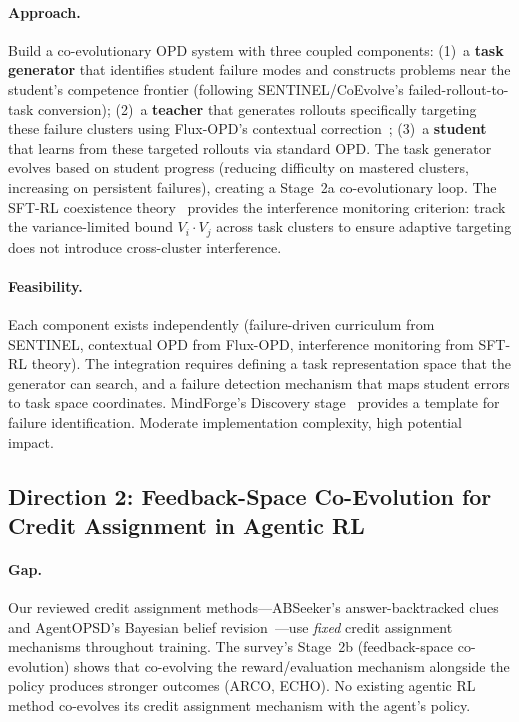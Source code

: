 \documentclass[11pt,a4paper]{article}
\begin{document}
\paragraph{Approach.} Build a co-evolutionary OPD system with three coupled components: (1)~a \textbf{task generator} that identifies student failure modes and constructs problems near the student's competence frontier (following SENTINEL/CoEvolve's failed-rollout-to-task conversion); (2)~a \textbf{teacher} that generates rollouts specifically targeting these failure clusters using Flux-OPD's contextual correction~\cite{flux2026opd}; (3)~a \textbf{student} that learns from these targeted rollouts via standard OPD. The task generator evolves based on student progress (reducing difficulty on mastered clusters, increasing on persistent failures), creating a Stage~2a co-evolutionary loop. The SFT-RL coexistence theory~\cite{zhu2026sft} provides the interference monitoring criterion: track the variance-limited bound $V_i \cdot V_j$ across task clusters to ensure adaptive targeting does not introduce cross-cluster interference.

\paragraph{Feasibility.} Each component exists independently (failure-driven curriculum from SENTINEL, contextual OPD from Flux-OPD, interference monitoring from SFT-RL theory). The integration requires defining a task representation space that the generator can search, and a failure detection mechanism that maps student errors to task space coordinates. MindForge's Discovery stage~\cite{macaron2026} provides a template for failure identification. Moderate implementation complexity, high potential impact.

\subsection{Direction 2: Feedback-Space Co-Evolution for Credit Assignment in Agentic RL}

\paragraph{Gap.} Our reviewed credit assignment methods---ABSeeker's answer-backtracked clues~\cite{abseeker2026} and AgentOPSD's Bayesian belief revision~\cite{agentopsd2026}---use \emph{fixed} credit assignment mechanisms throughout training. The survey's Stage~2b (feedback-space co-evolution) shows that co-evolving the reward/evaluation mechanism alongside the policy produces stronger outcomes (ARCO, ECHO). No existing agentic RL method co-evolves its credit assignment mechanism with the agent's policy.
\end{document}
